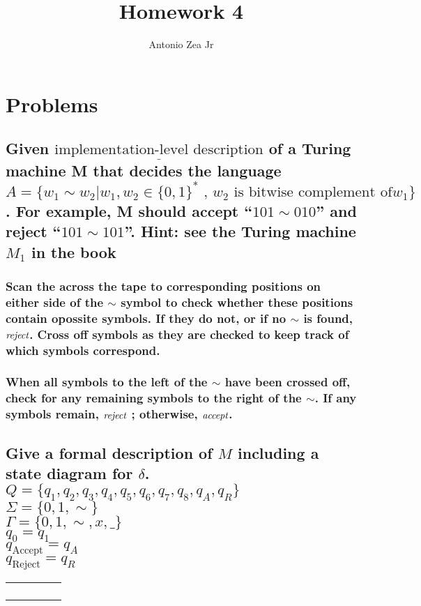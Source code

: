 \documentclass[english]{article}
\begin{document}
\title{Homework 4}
\author{Antonio Zea Jr}
\maketitle

\section*{Problems}

\subsection{Given $\underline{\text{implementation-level description}}$ of a
Turing machine M that decides the language $A=\{w_{1}\sim w_{2}|w_{1},w_{2}\in\{0,1\}^{*}\text{ , }w_{2}\text{ is bitwise complement of}w_{1}\}$.
For example, M should accept \textquotedblleft $101\sim010$\textquotedblright{}
and reject \textquotedblleft $101\sim101$\textquotedblright . Hint:
see the Turing machine $M_{1}$ in the book}

\subsubsection*{Scan the across the tape to corresponding positions on either side
of the $\sim$ symbol to check whether these positions contain opossite
symbols. If they do not, or if no $\sim$ is found, $\emph{reject}$.
Cross off symbols as they are checked to keep track of which symbols
correspond.}

\subsubsection*{When all symbols to the left of the $\sim$ have been crossed off,
check for any remaining symbols to the right of the $\sim$. If any
symbols remain, $\emph{reject}$ ; otherwise, $\emph{accept}$.}

\subsection{Give a formal description of $M$ including a state diagram for $\delta$.\protect \\
$Q=\{q_{1},q_{2},q_{3},q_{4},q_{5},q_{6},q_{7},q_{8},q_{A},q_{R}\}$\protect \\
$\Sigma=\{0,1,\sim\}$\protect \\
$\Gamma=\{0,1,\sim,x,\_\}$\protect \\
$q_{0}=q_{1}$\protect \\
$q_{\text{Accept}}=q_{A}$\protect \\
$q_{\text{Reject}}=q_{R}$\protect \\
}
\begin{tabular}{|c|c|c|c|c|}
\hline 
 &  &  &  & \tabularnewline
\hline 
\hline 
 &  &  &  & \tabularnewline
\hline 
 &  &  &  & \tabularnewline
\hline 
 &  &  &  & \tabularnewline
\hline 
 &  &  &  & \tabularnewline
\hline 
\end{tabular}
\end{document}
